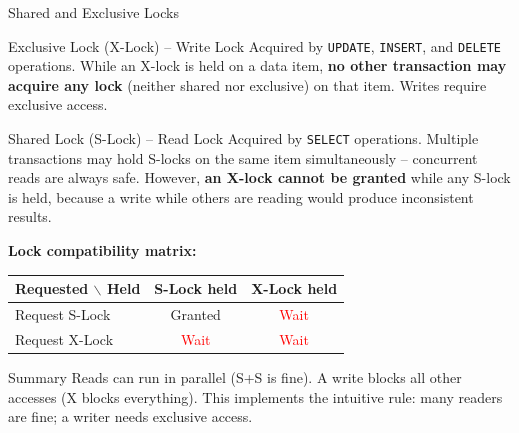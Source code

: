 \begin{frame}{Shared and Exclusive Locks}
  \begin{block}{Exclusive Lock (X-Lock) -- Write Lock}
    Acquired by \texttt{UPDATE}, \texttt{INSERT}, and \texttt{DELETE} operations. While an X-lock
    is held on a data item, \textbf{no other transaction may acquire any lock} (neither shared nor
    exclusive) on that item. Writes require exclusive access.
  \end{block}

  \begin{block}{Shared Lock (S-Lock) -- Read Lock}
    Acquired by \texttt{SELECT} operations. Multiple transactions may hold S-locks on the same
    item simultaneously -- concurrent reads are always safe. However, \textbf{an X-lock cannot be
    granted} while any S-lock is held, because a write while others are reading would produce
    inconsistent results.
  \end{block}

  \medskip
  \textbf{Lock compatibility matrix:}

  \begin{tabular}{@{}lcc@{}}
    \toprule
    \textbf{Requested} $\backslash$ \textbf{Held} & \textbf{S-Lock held} & \textbf{X-Lock held} \\
    \midrule
    Request S-Lock & \textcolor{green!60!black}{Granted} & \textcolor{red}{Wait} \\
    Request X-Lock & \textcolor{red}{Wait} & \textcolor{red}{Wait} \\
    \bottomrule
  \end{tabular}

  \medskip
  \begin{examples}{Summary}
    Reads can run in parallel (S+S is fine). A write blocks all other accesses (X blocks
    everything). This implements the intuitive rule: many readers are fine; a writer needs
    exclusive access.
  \end{examples}
\end{frame}


